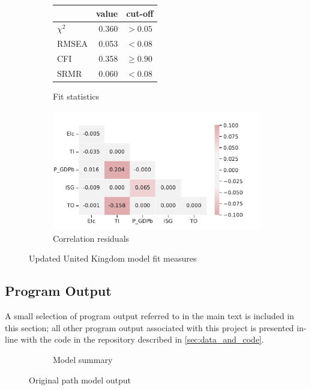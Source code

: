 \documentclass[11pt,a4paper]{article}
\begin{document}
\begin{figure}[htbp]
\begin{subfigure}{0.4\textwidth}
\centering
\begin{tabular}{lrl}
\toprule
{} &  value &      cut-off \\
\midrule
$\chi^2$ &  0.360 &     $> 0.05$ \\
RMSEA    &  0.053 &      $<0.08$ \\
CFI      &  0.358 &  $\geq 0.90$ \\
SRMR     &  0.060 &      $<0.08$ \\
\bottomrule
\end{tabular}
\caption{Fit statistics}
\label{tab:updated_fit_statistics}
\end{subfigure}
\begin{subfigure}{0.6\textwidth}
\centering
\includegraphics[width=\textwidth]{./plots/gbr_correlation_residuals.pdf}
\caption{Correlation residuals}
\label{fig:updated_fit_residuals}
\end{subfigure}
\caption{Updated United Kingdom model fit measures}
\label{fig:gbr_fit}
\end{figure}

\clearpage
\subsection{Program Output}\label{sec:program_output}

A small selection of program output referred to in the main text is included in this section; all other program output associated with this project is presented in-line with the code in the repository described in \cref{sec:data_and_code}.

\pagestyle{empty}

\begin{figure}[htbp]
\begin{subfigure}{\textwidth}
\small{}
\caption{Model summary}
\end{subfigure}
\caption{Original path model output}
\label{fig:orig_model_output}
\end{figure}
\end{document}
